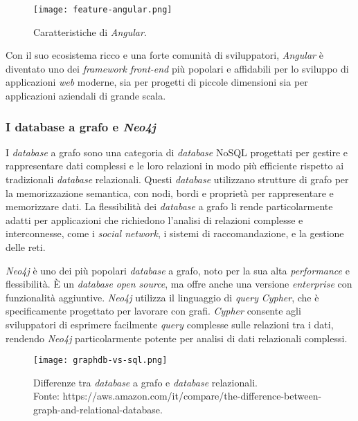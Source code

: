\begin{figure}[h] 
  \centering 
  \texttt{[image: feature-angular.png]} 
  \caption{Caratteristiche di \textit{Angular}.}
  \label{fig:workflow-stage}
\end{figure}

Con il suo ecosistema ricco e una forte comunità di sviluppatori, \textit{Angular} è diventato uno dei \textit{framework} \textit{front-end} più popolari e 
affidabili per lo sviluppo di applicazioni \textit{web} moderne, sia per progetti di piccole dimensioni sia per applicazioni aziendali di grande scala.

\subsubsection*{I database a grafo e \textit{Neo4j}}

I \textit{database} a grafo sono una categoria di \textit{database} NoSQL progettati per gestire e rappresentare dati complessi e le loro relazioni 
in modo più efficiente rispetto ai tradizionali \textit{database} relazionali. Questi \textit{database} utilizzano strutture di grafo per la memorizzazione 
semantica, con nodi, bordi e proprietà per rappresentare e memorizzare dati. La flessibilità dei \textit{database} a grafo li rende particolarmente 
adatti per applicazioni che richiedono l'analisi di relazioni complesse e interconnesse, come i \textit{social network}, i sistemi di raccomandazione, 
e la gestione delle reti.

\textit{Neo4j} è uno dei più popolari \textit{database} a grafo, noto per la sua alta \textit{performance} e flessibilità. È un \textit{database} \textit{open source}, 
ma offre anche una versione \textit{enterprise} con funzionalità aggiuntive. \textit{Neo4j} utilizza il linguaggio di \textit{query} \textit{Cypher}, che è specificamente 
progettato per lavorare con grafi. \textit{Cypher} consente agli sviluppatori di esprimere facilmente \textit{query} complesse sulle relazioni tra i dati, 
rendendo \textit{Neo4j} particolarmente potente per analisi di dati relazionali complessi.

\begin{figure}[h] 
  \centering 
  \texttt{[image: graphdb-vs-sql.png]} 
  \caption{Differenze tra \textit{database} a grafo e \textit{database} relazionali. \\Fonte: https://aws.amazon.com/it/compare/the-difference-between-graph-and-relational-database.}
  \label{fig:graphdb-vs-sql}
\end{figure}

